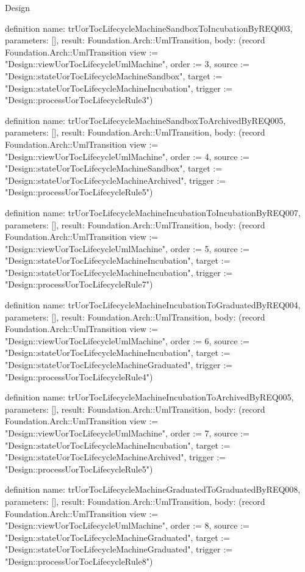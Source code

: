 \begin{lexlean}{Design}
\begin{semanticmodule}
definition{
  name: trUorTocLifecycleMachineSandboxToIncubationByREQ003,
  parameters: [],
  result: Foundation.Arch::UmlTransition,
  body: (record Foundation.Arch::UmlTransition {view := "Design::viewUorTocLifecycleUmlMachine", order := 3, source := "Design::stateUorTocLifecycleMachineSandbox", target := "Design::stateUorTocLifecycleMachineIncubation", trigger := "Design::processUorTocLifecycleRule3"})
}

definition{
  name: trUorTocLifecycleMachineSandboxToArchivedByREQ005,
  parameters: [],
  result: Foundation.Arch::UmlTransition,
  body: (record Foundation.Arch::UmlTransition {view := "Design::viewUorTocLifecycleUmlMachine", order := 4, source := "Design::stateUorTocLifecycleMachineSandbox", target := "Design::stateUorTocLifecycleMachineArchived", trigger := "Design::processUorTocLifecycleRule5"})
}

definition{
  name: trUorTocLifecycleMachineIncubationToIncubationByREQ007,
  parameters: [],
  result: Foundation.Arch::UmlTransition,
  body: (record Foundation.Arch::UmlTransition {view := "Design::viewUorTocLifecycleUmlMachine", order := 5, source := "Design::stateUorTocLifecycleMachineIncubation", target := "Design::stateUorTocLifecycleMachineIncubation", trigger := "Design::processUorTocLifecycleRule7"})
}

definition{
  name: trUorTocLifecycleMachineIncubationToGraduatedByREQ004,
  parameters: [],
  result: Foundation.Arch::UmlTransition,
  body: (record Foundation.Arch::UmlTransition {view := "Design::viewUorTocLifecycleUmlMachine", order := 6, source := "Design::stateUorTocLifecycleMachineIncubation", target := "Design::stateUorTocLifecycleMachineGraduated", trigger := "Design::processUorTocLifecycleRule4"})
}

definition{
  name: trUorTocLifecycleMachineIncubationToArchivedByREQ005,
  parameters: [],
  result: Foundation.Arch::UmlTransition,
  body: (record Foundation.Arch::UmlTransition {view := "Design::viewUorTocLifecycleUmlMachine", order := 7, source := "Design::stateUorTocLifecycleMachineIncubation", target := "Design::stateUorTocLifecycleMachineArchived", trigger := "Design::processUorTocLifecycleRule5"})
}

definition{
  name: trUorTocLifecycleMachineGraduatedToGraduatedByREQ008,
  parameters: [],
  result: Foundation.Arch::UmlTransition,
  body: (record Foundation.Arch::UmlTransition {view := "Design::viewUorTocLifecycleUmlMachine", order := 8, source := "Design::stateUorTocLifecycleMachineGraduated", target := "Design::stateUorTocLifecycleMachineGraduated", trigger := "Design::processUorTocLifecycleRule8"})
}


\end{semanticmodule}
\end{lexlean}
